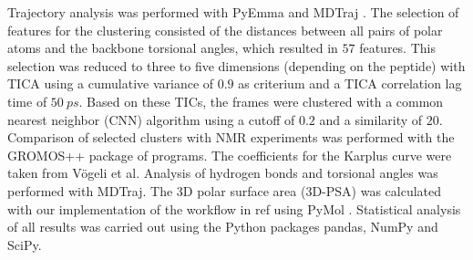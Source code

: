 Trajectory analysis was performed with PyEmma \cite{Scherer2015} and MDTraj \cite{Mcgibbon2015}. 
The selection of features for the clustering consisted of the distances between all pairs of polar atoms and the backbone torsional angles, which resulted in $57$ features. 
This selection was reduced to three to five dimensions (depending on the peptide) with TICA \cite{Molgedey1994} using a cumulative variance of $0.9$ as criterium and a TICA correlation lag time of $50~ps$. 
Based on these TICs, the frames were clustered with a common nearest neighbor (CNN) algorithm \cite{Keller2010, Weiß2021} using a cutoff of $0.2$ and a similarity of $20$. 
Comparison of selected clusters with NMR experiments was performed with the GROMOS++ package of programs. \cite{Eichenberger2011}
The coefficients for the Karplus curve were taken from Vögeli et al. \cite{Voegeli2015}
Analysis of hydrogen bonds and torsional angles was performed with MDTraj. 
The 3D polar surface area (3D-PSA) was calculated with our implementation \cite{Witek2019} of the workflow in ref \cite{Tyagi2018} using PyMol \cite{Delano2020}.
Statistical analysis of all results was carried out using the Python packages pandas, NumPy and SciPy.\cite{Virtanen2020}

